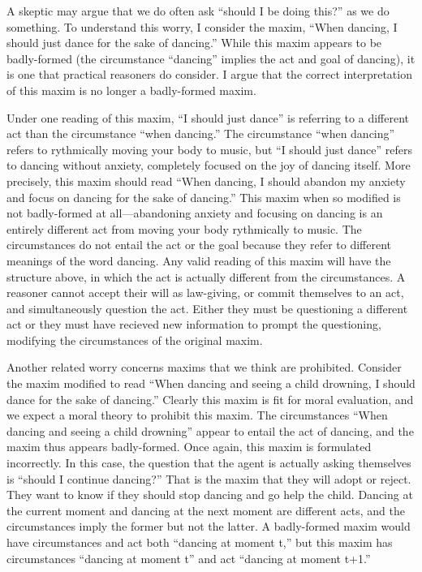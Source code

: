 \begin{isabellebody}
\begin{isamarkuptext}
A skeptic may argue that we do often ask ``should I be doing this?'' as we do something. 
To understand this worry, I consider the maxim, 
``When dancing, I should just dance for the sake of dancing.'' While this maxim appears to be badly-formed (the 
circumstance ``dancing'' implies the act and goal of dancing), it is one that practical reasoners 
do consider. I argue that the correct interpretation of this maxim is no longer a badly-formed maxim.

Under one reading of this maxim, ``I should just dance'' is referring to a different act than the 
circumstance ``when dancing.'' The circumstance ``when dancing'' refers 
to rythmically moving your body to music, but ``I should just dance'' refers to dancing without anxiety, 
completely focused on the joy of dancing itself. More precisely, this maxim should read ``When 
dancing, I should abandon my anxiety and focus on dancing for the sake of dancing.'' This maxim when so 
modified is not badly-formed at all—abandoning anxiety and focusing on dancing is an entirely different act 
from moving your body rythmically to music. The circumstances do not entail the act or the goal because 
they refer to different meanings of the word dancing. Any valid reading of this maxim will have the structure above, 
in which the act is actually different from the circumstances. A reasoner cannot accept their will 
as law-giving, or commit themselves to an act, and simultaneously question the act. Either they must be 
questioning a different act or they must have recieved new information to prompt the questioning, 
modifying the circumstances of the original maxim. 

Another related worry concerns maxims that we think are prohibited. Consider the maxim modified to 
read ``When dancing and seeing a child drowning, I should dance for the sake of dancing.'' Clearly this 
maxim is fit for moral evaluation, and we expect a moral theory to prohibit this maxim. The circumstances 
``When dancing and seeing a child drowning'' appear to entail the act of dancing, and the maxim thus 
appears badly-formed. Once again, this maxim is formulated incorrectly. In this case, the question 
that the agent is actually asking themselves is ``should I continue dancing?'' That is the 
maxim that they will adopt or reject. They want to know if they should stop dancing and go help the child. 
Dancing at the current moment and dancing at the next moment are different acts, and the circumstances 
imply the former but not the latter. A badly-formed maxim would have circumstances and act both 
``dancing at moment t,'' but this maxim has circumstances ``dancing at moment t'' and act ``dancing 
at moment t+1.''


\end{isamarkuptext}
\end{isabellebody}
